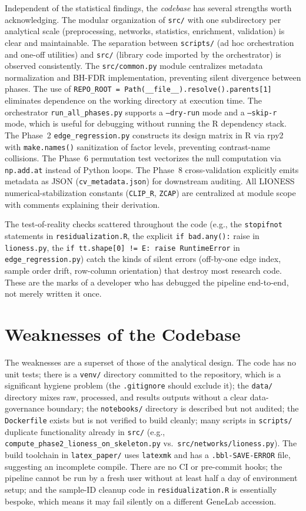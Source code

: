 \documentclass[11pt]{article}
\newcommand{\code}[1]{\texttt{#1}}
\newcommand{\pkg}[1]{\textsf{#1}}
\begin{document}
Independent of the statistical findings, the \emph{codebase} has several strengths worth acknowledging. The modular organization of \code{src/} with one subdirectory per analytical scale (preprocessing, networks, statistics, enrichment, validation) is clear and maintainable. The separation between \code{scripts/} (ad hoc orchestration and one-off utilities) and \code{src/} (library code imported by the orchestrator) is observed consistently. The \code{src/common.py} module centralizes metadata normalization and BH-FDR implementation, preventing silent divergence between phases. The use of \code{REPO\_ROOT = Path(\_\_file\_\_).resolve().parents[1]} eliminates dependence on the working directory at execution time. The orchestrator \code{run\_all\_phases.py} supports a \code{--dry-run} mode and a \code{--skip-r} mode, which is useful for debugging without running the R dependency stack. The Phase~2 \code{edge\_regression.py} constructs its design matrix in R via \pkg{rpy2} with \code{make.names()} sanitization of factor levels, preventing contrast-name collisions. The Phase~6 permutation test vectorizes the null computation via \code{np.add.at} instead of Python loops. The Phase~8 cross-validation explicitly emits metadata as JSON (\code{cv\_metadata.json}) for downstream auditing. All LIONESS numerical-stabilization constants (\code{CLIP\_R}, \code{ZCAP}) are centralized at module scope with comments explaining their derivation.

The test-of-reality checks scattered throughout the code (e.g., the \code{stopifnot} statements in \code{residualization.R}, the explicit \code{if bad.any():} raise in \code{lioness.py}, the \code{if tt.shape[0] != E: raise RuntimeError} in \code{edge\_regression.py}) catch the kinds of silent errors (off-by-one edge index, sample order drift, row-column orientation) that destroy most research code. These are the marks of a developer who has debugged the pipeline end-to-end, not merely written it once.

\section{Weaknesses of the Codebase}

The weaknesses are a superset of those of the analytical design. The code has no unit tests; there is a \code{venv/} directory committed to the repository, which is a significant hygiene problem (the \code{.gitignore} should exclude it); the \code{data/} directory mixes raw, processed, and results outputs without a clear data-governance boundary; the \code{notebooks/} directory is described but not audited; the \code{Dockerfile} exists but is not verified to build cleanly; many scripts in \code{scripts/} duplicate functionality already in \code{src/} (e.g., \code{compute\_phase2\_lioness\_on\_skeleton.py} vs.\ \code{src/networks/lioness.py}). The build toolchain in \code{latex\_paper/} uses \code{latexmk} and has a \code{.bbl-SAVE-ERROR} file, suggesting an incomplete compile. There are no CI or pre-commit hooks; the pipeline cannot be run by a fresh user without at least half a day of environment setup; and the sample-ID cleanup code in \code{residualization.R} is essentially bespoke, which means it may fail silently on a different GeneLab accession.
\end{document}
